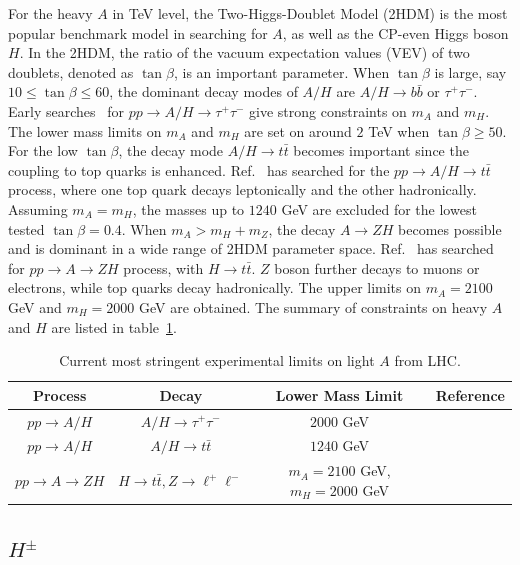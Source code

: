 \documentclass[a4paper,11pt]{article}
\begin{document}
For the heavy $A$ in TeV level, the Two-Higgs-Doublet Model (2HDM) is the most popular benchmark model in searching for $A$, as well as the CP-even Higgs boson $H$.
In the 2HDM, the ratio of the vacuum expectation values (VEV) of two doublets, 
denoted as $\tan\beta$, is an important parameter. 
When $\tan\beta$ is large, say $10\leq\tan\beta\leq 60$, 
the dominant decay modes of $A/H$ are $A/H\to b\bar{b}$ or $\tau^+\tau^-$. 
Early searches~\cite{ATLAS:2020zms,CMS:2022goy} for $pp\to A/H\to \tau^+\tau^-$ give strong constraints on $m_A$ and $m_H$. 
The lower mass limits on $m_A$ and $m_H$ are set on around $2$ TeV when $\tan\beta\geq 50$. 
For the low $\tan\beta$, the decay mode $A/H\to t\bar{t}$ becomes important since the coupling to top quarks is enhanced.
Ref.~\cite{ATLAS:2024vxm} has searched for the $pp\to A/H\to t\bar{t}$ process, 
where one top quark decays leptonically and the other hadronically.
Assuming $m_A=m_H$, the masses up to $1240$ GeV are excluded for the lowest tested $\tan\beta=0.4$. 
When $m_A>m_H+m_Z$, the decay $A\to ZH$ becomes possible and is dominant in a wide range of 2HDM parameter space. 
Ref.~\cite{CMS:2024yiy} has searched for $pp\to A\to ZH$ process, 
with $H\to t\bar{t}$. 
$Z$ boson further decays to muons or electrons, 
while top quarks decay hadronically. 
The upper limits on $m_A=2100$ GeV and $m_H=2000$ GeV are obtained. 
The summary of constraints on heavy $A$ and $H$ are listed in table~\ref{table:heavy-higgs}.

\begin{table}
  \centering 
    \begin{tabular}{cccc}
    Process  & Decay & Lower Mass Limit & Reference \\
     \hline
    $pp\to A/H$ & $A/H\to \tau^+\tau^-$ & $2000$ GeV & \cite{ATLAS:2020zms,CMS:2022goy} \\
    $pp\to A/H$  & $A/H\to t\bar{t}$ &   
$1240$ GeV       &     \cite{ATLAS:2024vxm}        \\%
$pp\to A\to ZH$  & $H\to t\bar{t},Z\to\ell^+\ell^-$ &   
$m_A=2100$ GeV, $m_H=2000$ GeV      &     \cite{CMS:2024yiy}        \\%
    \hline
    \end{tabular}
      \caption{Current most stringent experimental limits on light $A$ from LHC.}
      \label{table:heavy-higgs}
  \end{table} 

\subsection{$H^\pm$}
\end{document}

